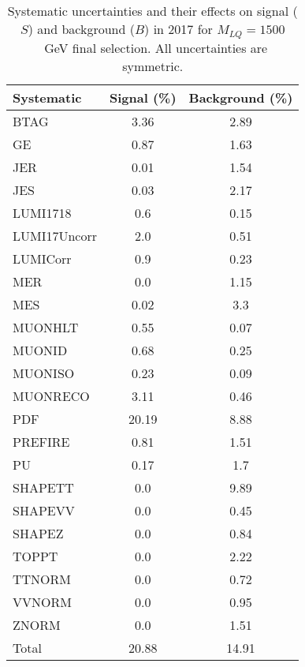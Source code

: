 \begin{table}[htbp]
\begin{center}
\caption{Systematic uncertainties and their effects on signal ($S$) and background ($B$) in 2017 for $M_{LQ}=1500$~GeV final selection. All uncertainties are symmetric.}
\begin{tabular}{lcc}
\hline\hline
Systematic & Signal (\%) & Background (\%) \\ \hline 
BTAG & 3.36 & 2.89\\ 
GE & 0.87 & 1.63\\ 
JER & 0.01 & 1.54\\ 
JES & 0.03 & 2.17\\ 
LUMI1718 & 0.6 & 0.15\\ 
LUMI17Uncorr & 2.0 & 0.51\\ 
LUMICorr & 0.9 & 0.23\\ 
MER & 0.0 & 1.15\\ 
MES & 0.02 & 3.3\\ 
MUONHLT & 0.55 & 0.07\\ 
MUONID & 0.68 & 0.25\\ 
MUONISO & 0.23 & 0.09\\ 
MUONRECO & 3.11 & 0.46\\ 
PDF & 20.19 & 8.88\\ 
PREFIRE & 0.81 & 1.51\\ 
PU & 0.17 & 1.7\\ 
SHAPETT & 0.0 & 9.89\\ 
SHAPEVV & 0.0 & 0.45\\ 
SHAPEZ & 0.0 & 0.84\\ 
TOPPT & 0.0 & 2.22\\ 
TTNORM & 0.0 & 0.72\\ 
VVNORM & 0.0 & 0.95\\ 
ZNORM & 0.0 & 1.51\\ 
Total & 20.88 & 14.91\\ \hline \hline
\end{tabular}
\label{tab:SysUncertainties_uujj_1500}
\end{center}
\end{table}

